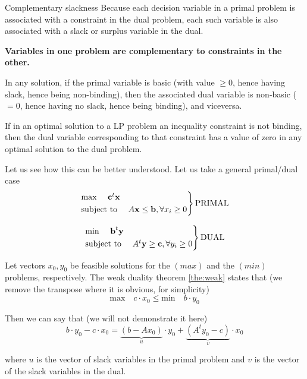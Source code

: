\documentclass[c]{beamer}
\begin{document}
\begin{frame}[allowframebreaks]{Complementary slackness}
  Because each decision variable in a primal problem is associated with a constraint in the dual problem, each such variable is also associated with a slack or surplus variable in the dual.

  {\bf Variables in one problem are complementary to constraints in the other.}

  In any solution, if the primal variable is basic (with value $\geq0$, hence having slack, hence being non-binding), then the associated dual variable is non-basic ($=0$, hence having no slack, hence being binding), and viceversa.


  \begin{theorem}
    If in an optimal solution to a LP problem an inequality constraint is not binding, then the dual variable corresponding to that constraint has a value of zero in any optimal solution to the dual problem. 
    \label{the:CST}
  \end{theorem}

  \framebreak

  Let us see how this can be better understood. Let us take a general primal/dual case
  \[
\begin{rcases}
\text{max }\quad\textbf{c}^t \textbf{x}\\
\text{subject to }\quad A\textbf{x}\leq \textbf{b}, \forall x_i\geq0
\end{rcases} \text{PRIMAL}
\]

\[
\begin{rcases}
\text{min }\quad\textbf{b}^t \textbf{y}\\
\text{subject to }\quad A^t\textbf{y}\geq \textbf{c}, \forall y_i\geq0
\end{rcases} \text{DUAL}
\]

  \framebreak

  Let vectors $x_0,y_0$ be feasible solutions for the $(max)$ and the $(min)$ problems, respectively. The weak duality theorem \ref{the:weak} states that (we remove the transpose where it is obvious, for simplicity)
  \[\text{max} \quad c\cdot x_0 \leq \text{min}\quad b\cdot y_0\]

  Then we can say that (we will not demonstrate it here)
  \[b\cdot y_0 - c\cdot x_0 = \underbrace{(b-Ax_0)}_u\cdot y_0+\underbrace{(A^ty_0-c)}_v\cdot x_0\]
  
  where $u$ is the vector of slack variables in the primal problem and $v$ is the vector of the slack variables in the dual.


\end{frame}
\end{document}
